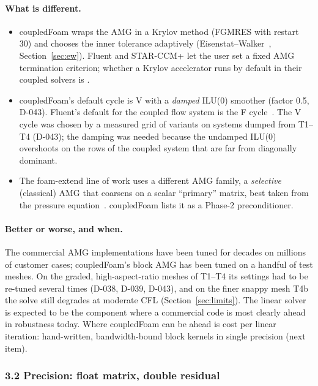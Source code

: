 \paragraph{What is different.}
\begin{itemize}
\item coupledFoam wraps the AMG in a Krylov method (FGMRES with restart 30)
  and chooses the inner tolerance adaptively
  (Eisenstat--Walker~\cite{EisenstatWalker1996},
  Section~\ref{sec:ew}). Fluent and STAR-CCM+ let the user set a fixed AMG
  termination criterion; whether a Krylov accelerator runs by default in
  their coupled solvers is \cmpnpd.
\item coupledFoam's default cycle is V with a \emph{damped} ILU(0)
  smoother (factor 0.5, D-043). Fluent's default for the coupled flow
  system is the F cycle~\cite{cmp-Fluent12UG}. The V cycle was chosen by a
  measured grid of variants on systems dumped from T1--T4 (D-043); the
  damping was needed because the undamped ILU(0) overshoots on the rows of
  the coupled system that are far from diagonally dominant.
\item The foam-extend line of work uses a different AMG family, a
  \emph{selective} (classical) AMG that coarsens on a scalar ``primary''
  matrix, best taken from the pressure equation~\cite{Uroic2018,Uroic2021}.
  coupledFoam lists it as a Phase-2 preconditioner.
\end{itemize}

\paragraph{Better or worse, and when.} The commercial AMG
implementations have been tuned for decades on millions of customer cases;
coupledFoam's block AMG has been tuned on a handful of test meshes. On the
graded, high-aspect-ratio meshes of T1--T4 its settings had to be
re-tuned several times (D-038, D-039, D-043), and on the finer snappy mesh
T4b the solve still degrades at moderate CFL (Section~\ref{sec:limits}).
The linear solver is expected to be the component where a commercial code
is most clearly ahead in robustness today. Where coupledFoam can be ahead is
cost per linear iteration: hand-written, bandwidth-bound block kernels in
single precision (next item).

\subsubsection*{3.2 Precision: float matrix, double residual}

